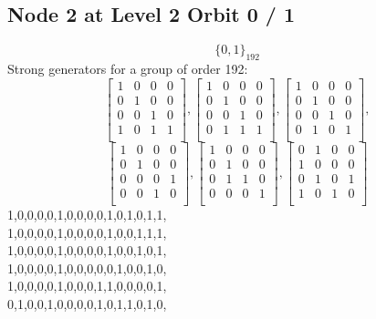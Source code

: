 \subsection*{Node 2 at Level 2 Orbit 0 / 1}
$$
\{ 0, 1 \}_{192}$$
{\small\arraycolsep=2pt
Strong generators for a group of order 192:
$$
\left[
\begin{array}{*{4}{r}}
1 & 0 & 0 & 0\\
0 & 1 & 0 & 0\\
0 & 0 & 1 & 0\\
1 & 0 & 1 & 1\\
\end{array}
\right]
, 
\left[
\begin{array}{*{4}{r}}
1 & 0 & 0 & 0\\
0 & 1 & 0 & 0\\
0 & 0 & 1 & 0\\
0 & 1 & 1 & 1\\
\end{array}
\right]
, 
\left[
\begin{array}{*{4}{r}}
1 & 0 & 0 & 0\\
0 & 1 & 0 & 0\\
0 & 0 & 1 & 0\\
0 & 1 & 0 & 1\\
\end{array}
\right]
, 
$$
$$
\left[
\begin{array}{*{4}{r}}
1 & 0 & 0 & 0\\
0 & 1 & 0 & 0\\
0 & 0 & 0 & 1\\
0 & 0 & 1 & 0\\
\end{array}
\right]
, 
\left[
\begin{array}{*{4}{r}}
1 & 0 & 0 & 0\\
0 & 1 & 0 & 0\\
0 & 1 & 1 & 0\\
0 & 0 & 0 & 1\\
\end{array}
\right]
, 
\left[
\begin{array}{*{4}{r}}
0 & 1 & 0 & 0\\
1 & 0 & 0 & 0\\
0 & 1 & 0 & 1\\
1 & 0 & 1 & 0\\
\end{array}
\right]
$$
1,0,0,0,0,1,0,0,0,0,1,0,1,0,1,1,\\
1,0,0,0,0,1,0,0,0,0,1,0,0,1,1,1,\\
1,0,0,0,0,1,0,0,0,0,1,0,0,1,0,1,\\
1,0,0,0,0,1,0,0,0,0,0,1,0,0,1,0,\\
1,0,0,0,0,1,0,0,0,1,1,0,0,0,0,1,\\
0,1,0,0,1,0,0,0,0,1,0,1,1,0,1,0,\\
}
